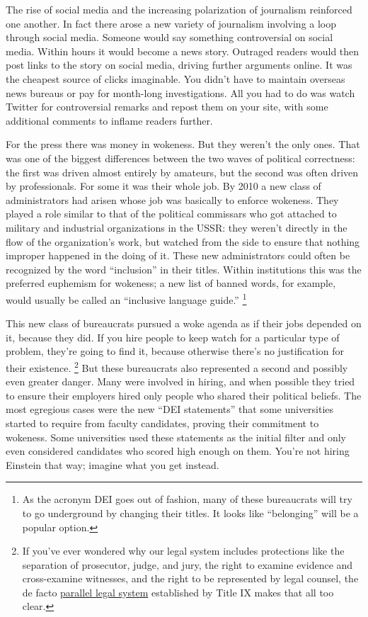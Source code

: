 \documentclass[12pt]{book}
\begin{document}
The rise of social media and the increasing polarization of journalism
reinforced one another. In fact there arose a new variety of journalism
involving a loop through social media. Someone would say something
controversial on social media. Within hours it would become a news
story. Outraged readers would then post links to the story on social
media, driving further arguments online. It was the cheapest source of
clicks imaginable. You didn't have to maintain overseas news bureaus or
pay for month-long investigations. All you had to do was watch Twitter
for controversial remarks and repost them on your site, with some
additional comments to inflame readers further.

For the press there was money in wokeness. But they weren't the only
ones. That was one of the biggest differences between the two waves of
political correctness: the first was driven almost entirely by amateurs,
but the second was often driven by professionals. For some it was their
whole job. By 2010 a new class of administrators had arisen whose job
was basically to enforce wokeness. They played a role similar to that of
the political commissars who got attached to military and industrial
organizations in the USSR: they weren't directly in the flow of the
organization's work, but watched from the side to ensure that nothing
improper happened in the doing of it. These new administrators could
often be recognized by the word ``inclusion'' in their titles. Within
institutions this was the preferred euphemism for wokeness; a new list
of banned words, for example, would usually be called an ``inclusive
language guide.'' \footnote{As the acronym DEI goes out of fashion, many of these
bureaucrats will try to go underground by changing their titles. It
looks like ``belonging'' will be a popular option.}

This new class of bureaucrats pursued a woke agenda as if their jobs
depended on it, because they did. If you hire people to keep watch for a
particular type of problem, they're going to find it, because otherwise
there's no justification for their existence. \footnote{If you've ever wondered why our legal system includes
protections like the separation of prosecutor, judge, and jury, the
right to examine evidence and cross-examine witnesses, and the right to
be represented by legal counsel, the de facto
\href{https://www.nytimes.com/2020/03/18/magazine/title-ix-sexual-harassment-accusations.html}{parallel
legal system} established by Title IX makes that all too clear.}
But these bureaucrats also represented a second and possibly even
greater danger. Many were involved in hiring, and when possible they
tried to ensure their employers hired only people who shared their
political beliefs. The most egregious cases were the new ``DEI
statements'' that some universities started to require from faculty
candidates, proving their commitment to wokeness. Some universities used
these statements as the initial filter and only even considered
candidates who scored high enough on them. You're not hiring Einstein
that way; imagine what you get instead.
\end{document}
